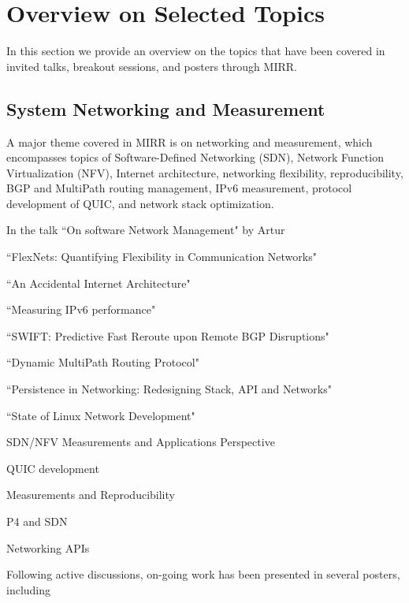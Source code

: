 \section{Overview on Selected Topics} \label{sec:content}

In this section we provide an overview on the topics that have been
covered in invited talks, breakout sessions, and posters through MIRR.

\subsection{System Networking and Measurement}

A major theme covered in MIRR is on networking and measurement, which
encompasses topics of Software-Defined Networking (SDN), Network Function
Virtualization (NFV), Internet architecture, networking flexibility, 
reproducibility, BGP and MultiPath routing management, IPv6 measurement,  
protocol development of QUIC, and network stack optimization. 


In the talk ``On software Network Management" by Artur

``FlexNets: Quantifying Flexibility in Communication Networks"

``An Accidental Internet Architecture"

``Measuring IPv6 performance"

``SWIFT: Predictive Fast Reroute upon Remote BGP Disruptions"

``Dynamic MultiPath Routing Protocol"

``Persistence in Networking: Redesigning Stack, API and Networks"

``State of Linux Network Development"


SDN/NFV Measurements and Applications Perspective

QUIC development

Measurements and Reproducibility

P4 and SDN

Networking APIs



Following active discussions, on-going work has been presented in 
several posters, including 


